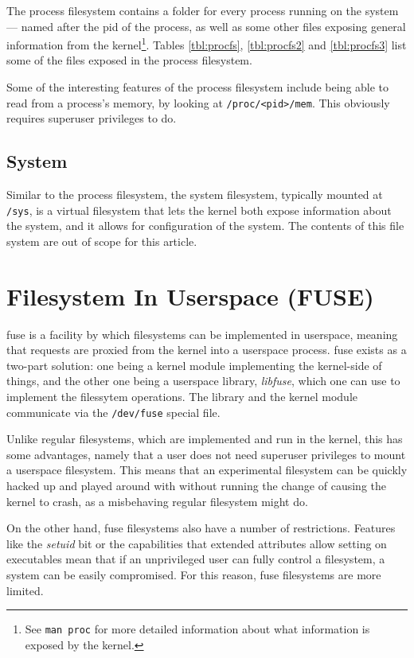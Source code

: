\documentclass[a4paper]{article}
\begin{document}
The process filesystem contains a folder for every process running on the system — named after the \gls{pid} of the process, as well as some other files exposing general information from the kernel\footnote{See \texttt{man proc} for more detailed information about what information is exposed by the kernel.}. Tables \ref{tbl:procfs}, \ref{tbl:procfs2} and \ref{tbl:procfs3} list some of the files exposed in the process filesystem.

Some of the interesting features of the process filesystem include being able to read from a process's memory, by looking at \verb|/proc/<pid>/mem|. This obviously requires superuser privileges to do.


\subsection{System}

Similar to the process filesystem, the system filesystem, typically mounted at \verb|/sys|, is a virtual filesystem that lets the kernel both expose information about the system, and it allows for configuration of the system. The contents of this file system are out of scope for this article.


\section{Filesystem In Userspace (FUSE)}

\gls{fuse} is a facility by which filesystems can be implemented in userspace, meaning that requests are proxied from the kernel into a userspace process. \gls{fuse} exists as a two-part solution: one being a kernel module implementing the kernel-side of things, and the other one being a userspace library, \emph{libfuse}, which one can use to implement the filessytem operations. The library and the kernel module communicate via the \verb|/dev/fuse| special file.

Unlike regular filesystems, which are implemented and run in the kernel, this has some advantages, namely that a user does not need superuser privileges to mount a userspace filesystem. This means that an experimental filesystem can be quickly hacked up and played around with without running the change of causing the kernel to crash, as a misbehaving regular filesystem might do. 

On the other hand, \gls{fuse} filesystems also have a number of restrictions. Features like the \emph{setuid} bit or the capabilities that extended attributes allow setting on executables mean that if an unprivileged user can fully control a filesystem, a system can be easily compromised. For this reason, \gls{fuse} filesystems are more limited.

\printglossaries

\printbibliography
\end{document}
